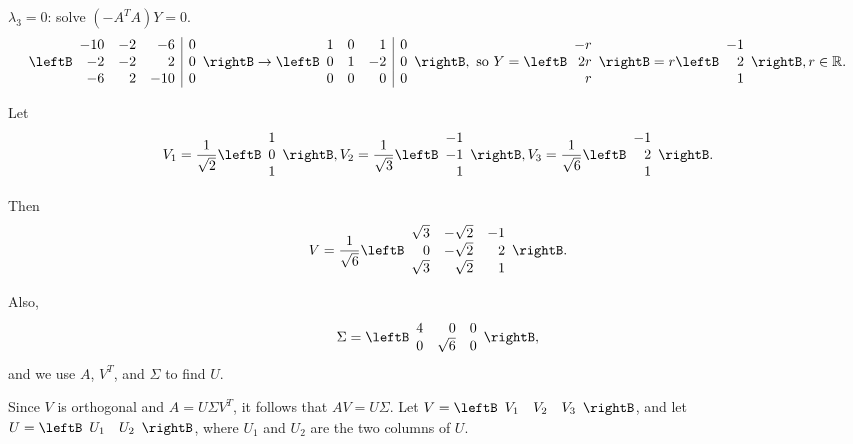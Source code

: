 \begin{solution}
$\lambda_3=0$: solve $(-A^TA)Y= 0$.
\[ \leftB\begin{array}{rrr|r}
-10 & -2 & -6 & 0 \\ -2 & -2 & 2 & 0 \\ -6 & 2 & -10 & 0
\end{array}\rightB
\rightarrow
\leftB\begin{array}{rrr|r}
1 & 0 & 1 & 0 \\ 0 & 1 & -2 & 0 \\ 0 & 0 & 0 & 0
\end{array}\rightB,
\mbox{ so }
Y=\leftB\begin{array}{r} -r \\ 2r \\ r \end{array}\rightB
=r\leftB\begin{array}{r} -1 \\ 2 \\ 1 \end{array}\rightB,
r\in \mathbb{R}. \]


Let
\[ V_1=\frac{1}{\sqrt{2}}\leftB\begin{array}{r} 1\\ 0\\ 1 \end{array}\rightB,
V_2=\frac{1}{\sqrt{3}}\leftB\begin{array}{r} -1\\ -1\\ 1 \end{array}\rightB,
V_3=\frac{1}{\sqrt{6}}\leftB\begin{array}{r} -1\\ 2\\ 1 \end{array}\rightB.\]

Then
\[ V=\frac{1}{\sqrt{6}}\leftB\begin{array}{rrr}
\sqrt 3 & -\sqrt 2 & -1  \\
0 & -\sqrt 2 & 2 \\
\sqrt 3 & \sqrt 2 & 1 \end{array}\rightB.\]

Also,
\[ \Sigma = \leftB\begin{array}{rrr} 4 & 0 & 0 \\
0 & \sqrt 6 & 0 \end{array}\rightB,\]
and we use $A$, $V^T$, and $\Sigma$ to find $U$.

Since $V$ is orthogonal and $A=U\Sigma V^T$, it follows that $AV=U\Sigma$.
Let $V=\leftB\begin{array}{ccc} V_1 & V_2 & V_3 \end{array}\rightB$, and
let $U=\leftB\begin{array}{cc} U_1 & U_2 \end{array}\rightB$, where
$U_1$ and $U_2$ are the two columns of $U$.


\end{solution}
